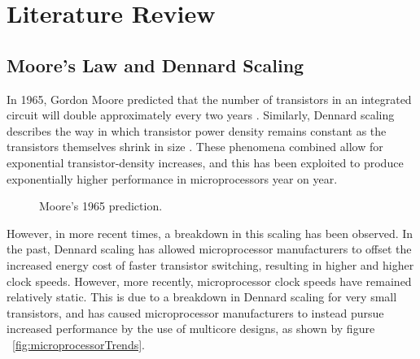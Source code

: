 \documentclass{UoYCSproject}
\begin{document}
\chapter{Literature Review}

\section{Moore's Law and Dennard Scaling}

In 1965, Gordon Moore predicted that the number of transistors in an integrated circuit will double
approximately every two years  \cite{moore}. Similarly, Dennard scaling describes the way in which transistor power density
remains constant as the transistors themselves shrink in size \cite{dennard}. These phenomena combined allow for exponential
transistor-density increases, and this has been exploited to produce exponentially higher performance in
microprocessors year on year.

\begin{figure}[h]
\caption{Moore's 1965 prediction. \cite{moore}}
\end{figure}

However, in more recent times, a breakdown in this scaling has been observed. In the past, Dennard scaling has allowed
microprocessor manufacturers to offset the increased energy cost of faster transistor switching, resulting in higher
and higher clock speeds. However, more recently, microprocessor clock speeds have remained relatively static. This is
due to a breakdown in Dennard scaling for very small transistors, and has caused microprocessor manufacturers to instead
pursue increased performance by the use of multicore designs, as shown by figure ~\ref{fig:microprocessorTrends}.
\end{document}

